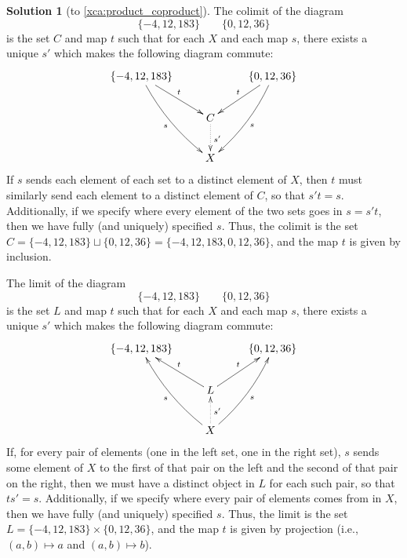 \documentclass{amsart}
\theoremstyle{definition} \newaliasedtheorem{defn}[thm]{Definition}
\theoremstyle{definition} \newtheorem*{defn*}{Definition}
\theoremstyle{definition} \newaliasedtheorem{xca}[thm]{Exercise}
\theoremstyle{definition} \newtheorem*{soln*}{Solution}
\theoremstyle{definition} \newaliasedtheorem{remark}[thm]{Remark}
\theoremstyle{definition} \newtheorem*{remark*}{Remark}
\begin{document}
    \begin{soln*}[to \autoref{xca:product_coproduct}] \label{sol:product_coproduct}
      The colimit of the diagram
      \[
        \{-4, 12, 183\}\qquad \{0, 12, 36\}
      \]
      is the set $C$ and map $t$ such that for each $X$ and each map $s$, there exists a unique $s'$ which makes the following diagram commute:
      \[
      \xymatrix{
        \{-4, 12, 183\}\ar@/_/[ddr]_s\ar[dr]^t && \{0, 12, 36\}\ar@/^/[ddl]^s\ar[dl]_t \\
        & C\ar@{.>}[d]^{s'}& \\
        &X&
      }
    \]
    If $s$ sends each element of each set to a distinct element of $X$, then $t$ must similarly send each element to a distinct element of $C$, so that $s't = s$.  Additionally, if we specify where every element of the two sets goes in $s = s't$, then we have fully (and uniquely) specified $s$.  Thus, the colimit is the set $C = \{-4, 12, 183\}\sqcup \{0, 12, 36\} = \{-4, 12, 183, 0, 12, 36\}$, and the map $t$ is given by inclusion.
    
    
      The limit of the diagram
      \[
        \{-4, 12, 183\}\qquad \{0, 12, 36\}
      \]
      is the set $L$ and map $t$ such that for each $X$ and each map $s$, there exists a unique $s'$ which makes the following diagram commute:
      \[
      \xymatrix{
        \{-4, 12, 183\} && \{0, 12, 36\} \\
        &L\ar[ul]_t\ar[ur]^t& \\
        &X\ar@/^/[uul]^s\ar@/_/[uur]_s\ar@{.>}[u]_{s'}&
      }
    \]
    If, for every pair of elements (one in the left set, one in the right set), $s$ sends some element of $X$ to the first of that pair on the left and the second of that pair on the right, then we must have a distinct object in $L$ for each such pair, so that $ts' = s$.  Additionally, if we specify where every pair of elements comes from in $X$, then we have fully (and uniquely) specified $s$.  Thus, the limit is the set $L = \{-4, 12, 183\}\times \{0, 12, 36\}$, and the map $t$ is given by projection (i.e., $(a, b) \mapsto a$ and $(a, b) \mapsto b$).
    \end{soln*}
  
\nocite{*}


\end{document}
